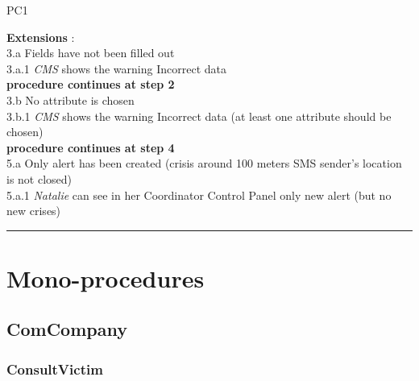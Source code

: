 \begin{lyxlist}{PC1}
{\item [\textbf{Extensions}]:\\
3.a Fields have not been filled out\\
	\hspace*{0.5cm} 3.a.1 \emph{CMS} shows the warning Incorrect data\\
	\hspace*{0.5cm} \textbf{procedure continues at step 2}\\
3.b No attribute is chosen\\
	\hspace*{0.5cm} 3.b.1 \emph{CMS} shows the warning Incorrect data 
	(at least one attribute should be chosen)\\
	\hspace*{0.5cm} \textbf{procedure continues at step 4}\\
5.a Only alert has been created (crisis around 100 meters SMS sender's location
is not closed)\\
	\hspace*{0.5cm} 5.a.1 \emph{Natalie} can see in her Coordinator Control Panel
	only new alert (but no new crises)\\
}
\end{lyxlist}
\hrule
\vspace{0.5cm}


\section{Mono-procedures}

\subsection{ComCompany}

\subsubsection{ConsultVictim}

